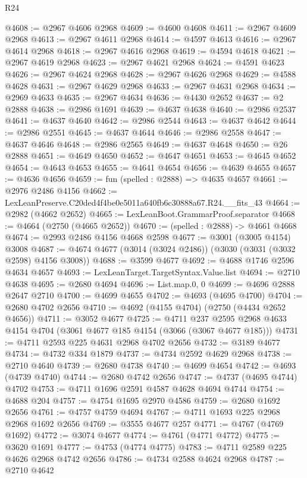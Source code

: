\begin{lexlean}{R24}
\begin{coremodule}
@4608 := @2967 @4606 @2968
@4609 := @4600 @4608
@4611 := @2967 @4609 @2968
@4613 := @2967 @4611 @2968
@4614 := @4597 @4613
@4616 := @2967 @4614 @2968
@4618 := @2967 @4616 @2968
@4619 := @4594 @4618
@4621 := @2967 @4619 @2968
@4623 := @2967 @4621 @2968
@4624 := @4591 @4623
@4626 := @2967 @4624 @2968
@4628 := @2967 @4626 @2968
@4629 := @4588 @4628
@4631 := @2967 @4629 @2968
@4633 := @2967 @4631 @2968
@4634 := @2969 @4633
@4635 := @2967 @4634
@4636 := @4430 @2652
@4637 := @2 @2888
@4638 := @2986 @1691
@4639 := @4637 @4638
@4640 := @2986 @2537
@4641 := @4637 @4640
@4642 := @2986 @2544
@4643 := @4637 @4642
@4644 := @2986 @2551
@4645 := @4637 @4644
@4646 := @2986 @2558
@4647 := @4637 @4646
@4648 := @2986 @2565
@4649 := @4637 @4648
@4650 := @26 @2888
@4651 := @4649 @4650
@4652 := @4647 @4651
@4653 := @4645 @4652
@4654 := @4643 @4653
@4655 := @4641 @4654
@4656 := @4639 @4655
@4657 := @4636 @4656
@4659 := fun (spelled : @2888) => @4635 @4657
@4661 := @2976 @2486 @4156
@4662 := LexLeanPreserve.C20ded4f4be0e5011a640fb6c30888a67.R24.__fits_43
@4664 := @2982 (@4662 @2652)
@4665 := LexLeanBoot.GrammarProof.separator
@4668 := @4664 (@2750 (@4665 @2652))
@4670 := (spelled : @2888) -> @4661 @4668
@4674 := @2993 @2486 @4156 @4668 @2598
@4677 := @3001 (@3005 @4154) @3008
@4687 := @4674 @4677 (@3014 (@3024 @2486)) (@3030 (@3031 (@3032 @2598) @4156 @3008))
@4688 := @3599 @4677
@4692 := @4688 @1746 @2596 @4634 @4657
@4693 := LexLeanTarget.TargetSyntax.Value.list
@4694 := @2710 @4638
@4695 := @2680 @4694
@4696 := List.map.{0, 0}
@4699 := @4696 @2888 @2647 @2710
@4700 := @4699 @4655
@4702 := @4693 (@4695 @4700)
@4704 := @2680 @4702 @2656
@4710 := @4692 (@4155 @4704) (@2750 (@4434 @2652 @4656))
@4711 := @3052 @4677
@4725 := @4711
    @237
    @2595
    @2968
    @4633
    @4154
    @4704
    (@3061 @4677 @185 @4154 (@3066 (@3067 @4677 @185)))
@4731 := @4711 @2593 @225 @4631 @2968 @4702 @2656
@4732 := @3189 @4677
@4734 := @4732 @334 @1879
@4737 := @4734 @2592 @4629 @2968
@4738 := @2710 @4640
@4739 := @2680 @4738
@4740 := @4699 @4654
@4742 := @4693 (@4739 @4740)
@4744 := @2680 @4742 @2656
@4747 := @4737 (@4695 @4744) @4702
@4753 := @4711 @1696 @2591 @4587 @4628 @4694 @4744
@4754 := @4688 @204
@4757 := @4754 @1695 @2970 @4586
@4759 := @2680 @1692 @2656
@4761 := @4757 @4759 @4694
@4767 := @4711 @1693 @225 @2968 @2968 @1692 @2656
@4769 := @3555 @4677 @257
@4771 := @4767 (@4769 @1692)
@4772 := @3074 @4677
@4774 := @4761 (@4771 @4772)
@4775 := @3620 @1691
@4777 := @4753 (@4774 @4775)
@4783 := @4711 @2589 @225 @4626 @2968 @4742 @2656
@4786 := @4734 @2588 @4624 @2968
@4787 := @2710 @4642

\end{coremodule}
\end{lexlean}
